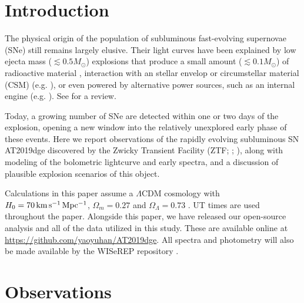 \documentclass[twocolumn]{aastex63}
\begin{document}
\begin{CJK*}{UTF8}{gbsn}
\vspace{1em}

\section{Introduction}
The physical origin of the population of subluminous fast-evolving supernovae (SNe) still remains 
largely elusive. Their light curves have been explained by low ejecta mass ($\lesssim 0.5M_\odot$) 
explosions that produce a small amount ($\lesssim 0.1M_\odot$) of radioactive material 
\citep{Shen2010, Sim2012, Moriya2017, Polin2019}, interaction with an stellar envelop or circumstellar 
material (CSM) (e.g. \citealt{KleiserKasen2018, Piro2015}), or even powered by alternative power 
sources, such as an internal engine (e.g. \citealt{Hotokezaka2017}). See \citet{Kasen2017} for a review.

Today, a growing number of SNe are detected within one or two days of the explosion, opening a new 
window into the relatively unexplored early phase of these events. Here we report observations of the 
rapidly evolving subluminous SN AT2019dge discovered by the Zwicky Transient Facility (ZTF; 
\citealt{Bellm2019b}; 
\citealt{Graham2019}), along with modeling of the bolometric lightcurve and early spectra, and a 
discussion of plausible explosion scenarios of this object.

Calculations in this paper assume a $\Lambda$CDM cosmology with $H_0= 70 \, \rm km \, s^{-1}\, 
Mpc^{-1}$, $\Omega_m = 0.27$ and $\Omega_{\Lambda} = 0.73$ \citep{Komatsu2011}. UT times are 
used throughout the paper. Alongside this paper, we have released our open-source analysis and all of 
the data utilized in this study. These are available online at 
\url{https://github.com/yaoyuhan/AT2019dge}. All spectra and photometry will also be made available 
by the WISeREP repository \citep{Yaron2012}.

\section{Observations} 

\end{CJK*}
\end{document}
